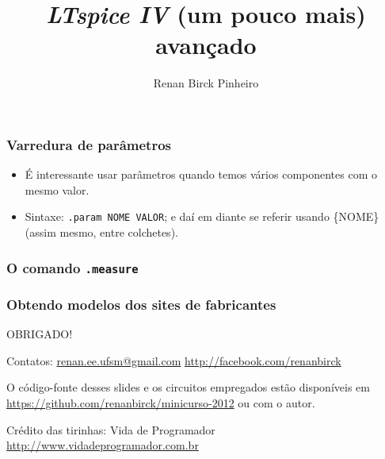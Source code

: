 \documentclass{beamer}
\title{\textit{LTspice IV} (um pouco mais) avançado}
\author{Renan Birck Pinheiro}
\institute{Universidade Federal de Santa Maria}
\begin{document}
\begin{frame}
\titlepage
\end{frame}

\begin{frame} %
\frametitle{Varredura de parâmetros}
\begin{itemize}
\item É interessante usar parâmetros quando temos vários componentes com o mesmo valor.
\item Sintaxe: \texttt{.param NOME VALOR}; e daí em diante se referir usando \{NOME\} (assim mesmo, entre colchetes).
\end{itemize}
\end{frame} %

\begin{frame}
\frametitle{O comando \texttt{.measure}}
\end{frame}

\begin{frame}
\frametitle{Obtendo modelos dos sites de fabricantes}
\end{frame}

\begin{frame}
{\LARGE OBRIGADO!}
\end{frame}

\begin{frame}
Contatos: \url{renan.ee.ufsm@gmail.com} \url{http://facebook.com/renanbirck} \newline

O código-fonte desses slides e os circuitos empregados estão disponíveis em \url{https://github.com/renanbirck/minicurso-2012} ou com o autor.

Crédito das tirinhas: Vida de Programador \url{http://www.vidadeprogramador.com.br}
\end{frame}
\end{document}
